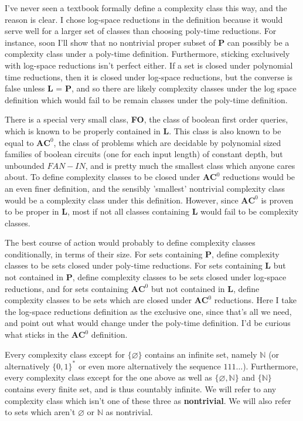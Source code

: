\par I've never seen a textbook formally define a complexity class this way, and the reason is clear. I chose log-space reductions in the definition because it would serve well for a larger set of classes than choosing poly-time reductions. For instance, soon I'll show that no nontrivial proper subset of \textbf{P} can possibly be a complexity class under a poly-time definition. Furthermore, sticking exclusively with log-space reductions isn't perfect either. If a set is closed under polynomial time reductions, then it is closed under log-space reductions, but the converse is false unless \textbf{L} = \textbf{P}, and so there are likely complexity classes under the log space definition which would fail to be remain classes under the poly-time definition. 
\par There is a special very small class, \textbf{FO}, the class of boolean first order queries, which is known to be properly contained in \textbf{L}. This class is also known to be equal to $\textbf{AC}^0$, the class of problems which are decidable by polynomial sized families of boolean circuits (one for each input length) of constant depth, but unbounded $FAN-IN$, and is pretty much the smallest class which anyone cares about. To define complexity classes to be closed under $\textbf{AC}^0$ reductions would be an even finer definition, and the sensibly 'smallest' nontrivial complexity class would be a complexity class under this definition. However, since $\textbf{AC}^0$ is proven to be proper in \textbf{L}, most if not all classes containing \textbf{L} would fail to be complexity classes.
\par The best course of action would probably to define complexity classes conditionally, in terms of their size. For sets containing \textbf{P}, define complexity classes to be sets closed under poly-time reductions. For sets containing \textbf{L} but not contained in \textbf{P}, define complexity classes to be sets closed under log-space reductions, and for sets containing $\textbf{AC}^0$ but not contained in \textbf{L}, define complexity classes to be sets which are closed under $\textbf{AC}^0$ reductions. Here I take the log-space reductions definition as the exclusive one, since that's all we need, and point out what would change under the poly-time definition. I'd be curious what sticks in the $\textbf{AC}^0$ definition.
\begin{lemma}
	Every complexity class except for $\{\varnothing\}$ contains an infinite set, namely $\mathbb{N}$ (or alternatively $\{0,1\}^*$ or even more alternatively the sequence $111\ldots$). Furthermore, every complexity class except for the one above as well as $\{\varnothing,\mathbb{N}\}$ and $\{\mathbb{N}\}$ contains every finite set, and is thus countably infinite. We will refer to any complexity class which isn't one of these three as \textbf{nontrivial}. We will also refer to sets which aren't $\varnothing$ or $\mathbb{N}$ as nontrivial.
\end{lemma} 
